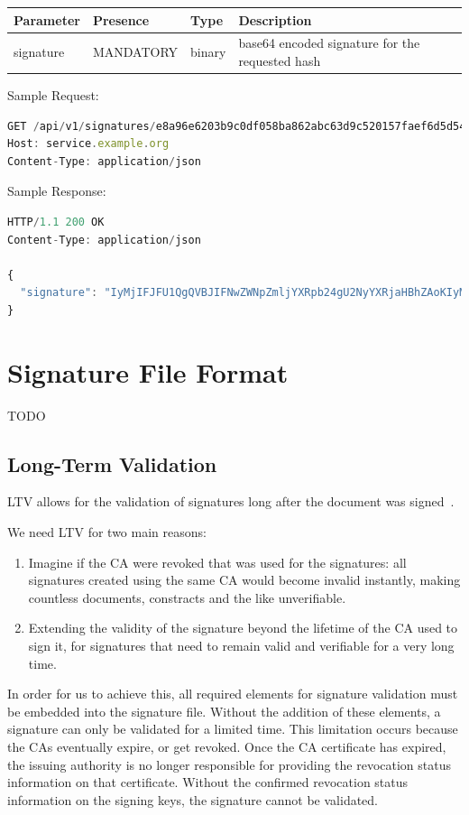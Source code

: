 \begin{tabular}{|l|l|l|l|}
	\hline
	Parameter & Presence & Type & Description \\ \hline
	signature & MANDATORY & binary & base64 encoded signature for the requested hash \\ \hline
\end{tabular}

Sample Request:

\begin{lstlisting}[caption={signature request}, captionpos=b, language=JavaScript, label={lst:signaturerequest}]
GET /api/v1/signatures/e8a96e6203b9c0df058ba862abc63d9c520157faef6d5d54e54e526b0a85b2be HTTP/1.
Host: service.example.org
Content-Type: application/json
\end{lstlisting}

Sample Response:

\begin{lstlisting}[caption={signature response}, captionpos=b, language=JavaScript, label={lst:signatureresponse}]
HTTP/1.1 200 OK
Content-Type: application/json

{
  "signature": "IyMjIFJFU1QgQVBJIFNwZWNpZmljYXRpb24gU2NyYXRjaHBhZAoKIyMjIyBQcmUtQXV0aCBlbmRw...b2ludCAKIyMjIyMgRW5kcG9pbnQKYGBgUE9TVCAvYXBpL3YxL3NpZ25gYGAK"
}
\end{lstlisting}

\section{Signature File Format}
TODO
\subsection{Long-Term Validation}
\gls{LTV} allows for the validation of signatures long after the document was signed~\cite{etsipades}.

We need \gls{LTV} for two main reasons:
\begin{enumerate}
    \item Imagine if the \gls{CA} were revoked that was used for the signatures: all signatures created using the same \gls{CA} would become invalid instantly, making countless documents, constracts and the like unverifiable.
    \item Extending the validity of the signature beyond the lifetime of the \gls{CA} used to sign it, for signatures that need to remain valid and verifiable for a very long time.
\end{enumerate}
In order for us to achieve this, all required elements for signature validation must be embedded into the signature file.
Without the addition of these elements, a signature can only be validated for a limited time.
This limitation occurs because the \gls{CA}s eventually expire, or get revoked.
Once the \gls{CA} certificate has expired, the issuing authority is no longer responsible for providing the revocation status information on that certificate.
Without the confirmed revocation status information on the signing keys, the signature cannot be validated.

